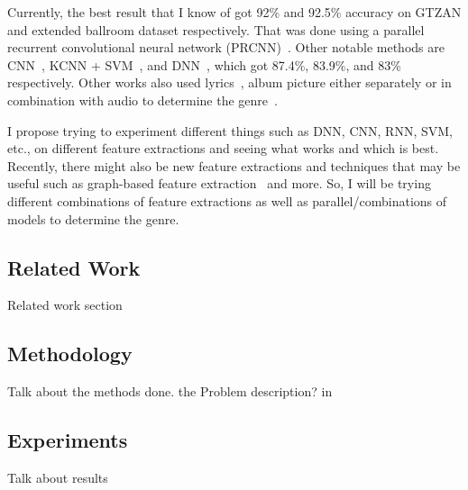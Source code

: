 \documentclass[10pt,twocolumn,letterpaper]{article}
\begin{document}
	Currently, the best result that I know of got 92\% and 92.5\% accuracy on GTZAN and extended ballroom dataset respectively. That was done using a parallel recurrent convolutional neural network (PRCNN)~\cite{yang2020parallel}. Other notable methods are CNN~\cite{zhang2016improved}, KCNN + SVM~\cite{zhang2015deep}, and DNN~\cite{sigtia2014improved}, which got 87.4\%, 83.9\%, and 83\% respectively. Other works also used lyrics~\cite{tsaptsinos2017lyrics}, album picture either separately or in combination with audio to determine the genre~\cite{oramas2017multi}.
	
	I propose trying to experiment different things such as DNN, CNN, RNN, SVM, etc., on different feature extractions and seeing what works and which is best. Recently, there might also be new feature extractions and techniques that may be useful such as graph-based feature extraction~\cite{melo2020graph} and more. So, I will be trying different combinations of feature extractions as well as parallel/combinations of models to determine the genre.
	
	\subsection{Related Work}
	
	Related work section
	
	\subsection{Methodology}
	
	Talk about the methods done. the Problem description? in 
	
	\subsection{Experiments}
	
	Talk about results
		
	{\small
		
		
	}
	
\end{document}
